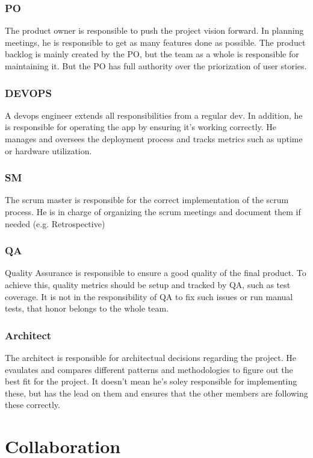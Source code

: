 \subsubsection*{PO}
The product owner is responsible to push the project vision forward.
In planning meetings, he is responsible to get as many features done as possible.
The product backlog is mainly created by the PO, but the team as a whole is responsible for maintaining it.
But the PO has full authority over the priorization of user stories.

\subsubsection*{DEVOPS}
A devops engineer extends all responsibilities from a regular dev.
In addition, he is responsible for operating the app by ensuring it's working correctly.
He manages and oversees the deployment process and tracks metrics such as uptime or hardware utilization.

\subsubsection*{SM}
The scrum master is responsible for the correct implementation of the scrum process.
He is in charge of organizing the scrum meetings and document them if needed (e.g. Retrospective)

\subsubsection*{QA}
Quality Assurance is responsible to ensure a good quality of the final product.
To achieve this, quality metrics should be setup and tracked by QA, such as test coverage.
It is not in the responsibility of QA to fix such issues or run manual tests, that honor belongs to the whole team.

\subsubsection*{Architect}
The architect is responsible for architectual decisions regarding the project.
He evaulates and compares different patterns and methodologies to figure out the best fit for the project.
It doesn't mean he's soley responsible for implementing these, but has the lead on them and ensures that the other members are following these correctly.

\section{Collaboration}


